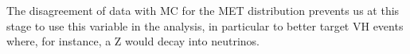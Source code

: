 








The disagreement of data with MC for the MET distribution prevents us at this stage to use this variable in the analysis, in particular to better target VH events where, for instance, a Z would decay into neutrinos.

